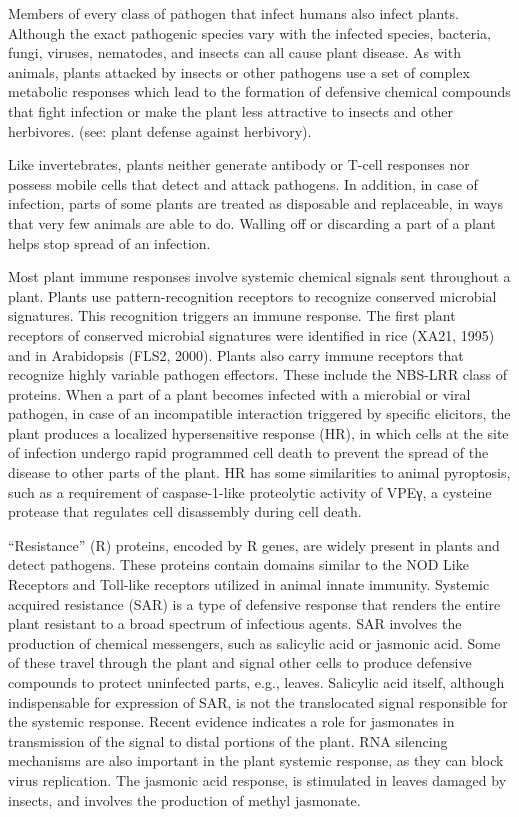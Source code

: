 Members of every class of pathogen that infect humans also infect plants. Although the exact pathogenic species vary with the infected species, bacteria, fungi, viruses, nematodes, and insects can all cause plant disease. As with animals, plants attacked by insects or other pathogens use a set of complex metabolic responses which lead to the formation of defensive chemical compounds that fight infection or make the plant less attractive to insects and other herbivores. (see: plant defense against herbivory).

Like invertebrates, plants neither generate antibody or T-cell responses nor possess mobile cells that detect and attack pathogens. In addition, in case of infection, parts of some plants are treated as disposable and replaceable, in ways that very few animals are able to do. Walling off or discarding a part of a plant helps stop spread of an infection.

Most plant immune responses involve systemic chemical signals sent throughout a plant. Plants use pattern-recognition receptors to recognize conserved microbial signatures. This recognition triggers an immune response. The first plant receptors of conserved microbial signatures were identified in rice (XA21, 1995) and in Arabidopsis (FLS2, 2000). Plants also carry immune receptors that recognize highly variable pathogen effectors. These include the NBS-LRR class of proteins. When a part of a plant becomes infected with a microbial or viral pathogen, in case of an incompatible interaction triggered by specific elicitors, the plant produces a localized hypersensitive response (HR), in which cells at the site of infection undergo rapid programmed cell death to prevent the spread of the disease to other parts of the plant. HR has some similarities to animal pyroptosis, such as a requirement of caspase-1-like proteolytic activity of VPEγ, a cysteine protease that regulates cell disassembly during cell death.

``Resistance'' (R) proteins, encoded by R genes, are widely present in plants and detect pathogens. These proteins contain domains similar to the NOD Like Receptors and Toll-like receptors utilized in animal innate immunity. Systemic acquired resistance (SAR) is a type of defensive response that renders the entire plant resistant to a broad spectrum of infectious agents. SAR involves the production of chemical messengers, such as salicylic acid or jasmonic acid. Some of these travel through the plant and signal other cells to produce defensive compounds to protect uninfected parts, e.g., leaves. Salicylic acid itself, although indispensable for expression of SAR, is not the translocated signal responsible for the systemic response. Recent evidence indicates a role for jasmonates in transmission of the signal to distal portions of the plant. RNA silencing mechanisms are also important in the plant systemic response, as they can block virus replication. The jasmonic acid response, is stimulated in leaves damaged by insects, and involves the production of methyl jasmonate.


